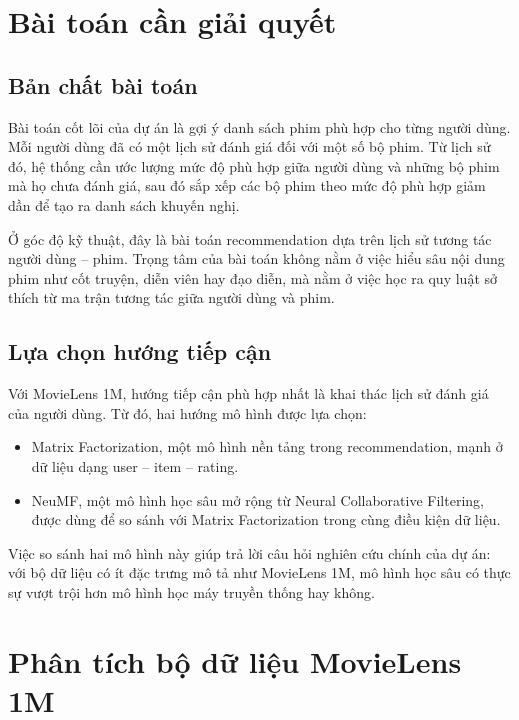 \documentclass[12pt,a4paper]{article}
\begin{document}
\section{Bài toán cần giải quyết}

\subsection{Bản chất bài toán}

Bài toán cốt lõi của dự án là gợi ý danh sách phim phù hợp cho từng người dùng. Mỗi người dùng đã có một lịch sử đánh giá đối với một số bộ phim. Từ lịch sử đó, hệ thống cần ước lượng mức độ phù hợp giữa người dùng và những bộ phim mà họ chưa đánh giá, sau đó sắp xếp các bộ phim theo mức độ phù hợp giảm dần để tạo ra danh sách khuyến nghị.

Ở góc độ kỹ thuật, đây là bài toán recommendation dựa trên lịch sử tương tác người dùng -- phim. Trọng tâm của bài toán không nằm ở việc hiểu sâu nội dung phim như cốt truyện, diễn viên hay đạo diễn, mà nằm ở việc học ra quy luật sở thích từ ma trận tương tác giữa người dùng và phim.

\subsection{Lựa chọn hướng tiếp cận}

Với MovieLens 1M, hướng tiếp cận phù hợp nhất là khai thác lịch sử đánh giá của người dùng. Từ đó, hai hướng mô hình được lựa chọn:

\begin{itemize}[leftmargin=1.5cm]
    \item Matrix Factorization, một mô hình nền tảng trong recommendation, mạnh ở dữ liệu dạng user -- item -- rating.
    \item NeuMF, một mô hình học sâu mở rộng từ Neural Collaborative Filtering, được dùng để so sánh với Matrix Factorization trong cùng điều kiện dữ liệu.
\end{itemize}

Việc so sánh hai mô hình này giúp trả lời câu hỏi nghiên cứu chính của dự án: với bộ dữ liệu có ít đặc trưng mô tả như MovieLens 1M, mô hình học sâu có thực sự vượt trội hơn mô hình học máy truyền thống hay không.

\section{Phân tích bộ dữ liệu MovieLens 1M}
\end{document}
